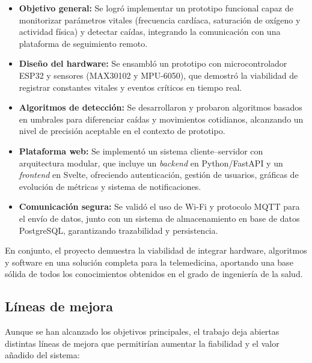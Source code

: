 \documentclass[12pt, a4paper]{article}
\begin{document}
\begin{itemize}
	\item \textbf{Objetivo general:} Se logró implementar un prototipo funcional capaz de monitorizar parámetros vitales (frecuencia cardíaca, saturación de oxígeno y actividad física) y detectar caídas, integrando la comunicación con una plataforma de seguimiento remoto.
	\item \textbf{Diseño del hardware:} Se ensambló un prototipo con microcontrolador ESP32 y sensores (MAX30102 y MPU-6050), que demostró la viabilidad de registrar constantes vitales y eventos críticos en tiempo real.
	\item \textbf{Algoritmos de detección:} Se desarrollaron y probaron algoritmos basados en umbrales para diferenciar caídas y movimientos cotidianos, alcanzando un nivel de precisión aceptable en el contexto de prototipo.
	\item \textbf{Plataforma web:} Se implementó un sistema cliente–servidor con arquitectura modular, que incluye un \emph{backend} en Python/FastAPI y un \emph{frontend} en Svelte, ofreciendo autenticación, gestión de usuarios, gráficas de evolución de métricas y sistema de notificaciones.
	\item \textbf{Comunicación segura:} Se validó el uso de Wi-Fi y protocolo MQTT para el envío de datos, junto con un sistema de almacenamiento en base de datos PostgreSQL, garantizando trazabilidad y persistencia.
\end{itemize}

En conjunto, el proyecto demuestra la viabilidad de integrar hardware, algoritmos y software en una solución completa para la telemedicina, aportando una base sólida de todos los conocimientos obtenidos en el grado de ingeniería de la salud.

\subsection{Líneas de mejora}

Aunque se han alcanzado los objetivos principales, el trabajo deja abiertas distintas líneas de mejora que permitirían aumentar la fiabilidad y el valor añadido del sistema:
\end{document}
